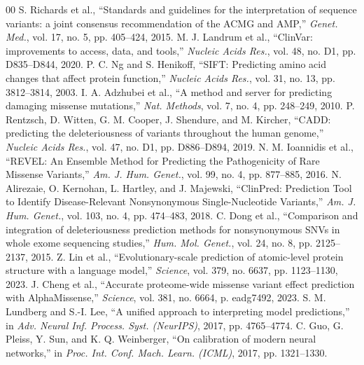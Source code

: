 \documentclass[conference]{IEEEtran}
\begin{document}
\begin{thebibliography}{00}
 S. Richards et al., ``Standards and guidelines for the interpretation of sequence variants: a joint consensus recommendation of the ACMG and AMP,'' \textit{Genet. Med.}, vol. 17, no. 5, pp. 405--424, 2015.
 M. J. Landrum et al., ``ClinVar: improvements to access, data, and tools,'' \textit{Nucleic Acids Res.}, vol. 48, no. D1, pp. D835--D844, 2020.
 P. C. Ng and S. Henikoff, ``SIFT: Predicting amino acid changes that affect protein function,'' \textit{Nucleic Acids Res.}, vol. 31, no. 13, pp. 3812--3814, 2003.
 I. A. Adzhubei et al., ``A method and server for predicting damaging missense mutations,'' \textit{Nat. Methods}, vol. 7, no. 4, pp. 248--249, 2010.
 P. Rentzsch, D. Witten, G. M. Cooper, J. Shendure, and M. Kircher, ``CADD: predicting the deleteriousness of variants throughout the human genome,'' \textit{Nucleic Acids Res.}, vol. 47, no. D1, pp. D886--D894, 2019.
 N. M. Ioannidis et al., ``REVEL: An Ensemble Method for Predicting the Pathogenicity of Rare Missense Variants,'' \textit{Am. J. Hum. Genet.}, vol. 99, no. 4, pp. 877--885, 2016.
 N. Alirezaie, O. Kernohan, L. Hartley, and J. Majewski, ``ClinPred: Prediction Tool to Identify Disease-Relevant Nonsynonymous Single-Nucleotide Variants,'' \textit{Am. J. Hum. Genet.}, vol. 103, no. 4, pp. 474--483, 2018.
 C. Dong et al., ``Comparison and integration of deleteriousness prediction methods for nonsynonymous SNVs in whole exome sequencing studies,'' \textit{Hum. Mol. Genet.}, vol. 24, no. 8, pp. 2125--2137, 2015.
 Z. Lin et al., ``Evolutionary-scale prediction of atomic-level protein structure with a language model,'' \textit{Science}, vol. 379, no. 6637, pp. 1123--1130, 2023.
 J. Cheng et al., ``Accurate proteome-wide missense variant effect prediction with AlphaMissense,'' \textit{Science}, vol. 381, no. 6664, p. eadg7492, 2023.
 S. M. Lundberg and S.-I. Lee, ``A unified approach to interpreting model predictions,'' in \textit{Adv. Neural Inf. Process. Syst. (NeurIPS)}, 2017, pp. 4765--4774.
 C. Guo, G. Pleiss, Y. Sun, and K. Q. Weinberger, ``On calibration of modern neural networks,'' in \textit{Proc. Int. Conf. Mach. Learn. (ICML)}, 2017, pp. 1321--1330.
\end{thebibliography}
\end{document}
